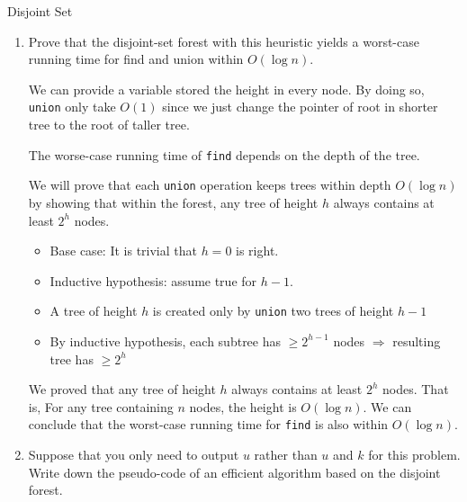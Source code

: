 \begin{homeworkProblem}{Disjoint Set}
    \begin{enumerate}[label=(\arabic*)]
        \item
            Prove that the disjoint-set forest with this heuristic yields a 
            worst-case running time for find and union within $O(\log n)$.

            We can provide a variable stored the height in every node. By doing 
            so, \texttt{union} only take $O(1)$ since we just change the pointer
            of root in shorter tree to the root of taller tree.

            The worse-case running time of \texttt{find} depends on the depth of 
            the tree.

            We will prove that each \texttt{union} operation keeps trees within 
            depth $O(\log n)$ by showing that within the forest, any tree of 
            height $h$ always contains at least $2^h$ nodes.

            \begin{itemize}
                \item Base case: It is trivial that $h = 0$ is right.
                \item Inductive hypothesis: assume true for $h - 1$. 
                \item A tree of height $h$ is created only by \texttt{union}
                    two trees of height $h - 1$
                \item By inductive hypothesis, each subtree has $\geq 2^{h-1}$
                    nodes $\Rightarrow$ resulting tree has $\geq 2^{h}$
            \end{itemize}

            We proved that any tree of height $h$ always contains at least $2^h$
            nodes. That is, For any tree containing $n$ nodes, the height is 
            $O(\log n)$. We can conclude that the worst-case running time for
            \texttt{find} is also within $O(\log n)$.

        \item
            Suppose that you only need to output $u$ rather than $u$ and $k$ for
            this problem. Write down the pseudo-code of an efficient algorithm
            based on the disjoint forest.

            \begin{algorithm}[]
                \begin{algorithmic}[1]
                    \EndFunction{}
                \end{algorithmic}
                \caption{An efficient algorithm to output $u$ based on the disjoint forest.}
            \end{algorithm}


\end{enumerate}
\end{homeworkProblem}
